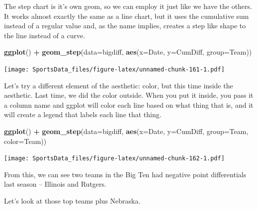 \documentclass[
]{book}
\newenvironment{Shaded}{\begin{snugshade}}{\end{snugshade}}
\newcommand{\DataTypeTok}[1]{\textcolor[rgb]{0.13,0.29,0.53}{#1}}
\newcommand{\KeywordTok}[1]{\textcolor[rgb]{0.13,0.29,0.53}{\textbf{#1}}}
\newcommand{\NormalTok}[1]{#1}
\newcommand{\OperatorTok}[1]{\textcolor[rgb]{0.81,0.36,0.00}{\textbf{#1}}}
\newcommand{\StringTok}[1]{\textcolor[rgb]{0.31,0.60,0.02}{#1}}
\begin{document}
The step chart is it's own geom, so we can employ it just like we have the others. It works almost exactly the same as a line chart, but it uses the cumulative sum instead of a regular value and, as the name implies, creates a step like shape to the line instead of a curve.

\begin{Shaded}
\begin{Highlighting}[]
\KeywordTok{ggplot}\NormalTok{() }\OperatorTok{+}\StringTok{ }\KeywordTok{geom_step}\NormalTok{(}\DataTypeTok{data=}\NormalTok{bigdiff, }\KeywordTok{aes}\NormalTok{(}\DataTypeTok{x=}\NormalTok{Date, }\DataTypeTok{y=}\NormalTok{CumDiff, }\DataTypeTok{group=}\NormalTok{Team))}
\end{Highlighting}
\end{Shaded}

\texttt{[image: SportsData\_files/figure-latex/unnamed-chunk-161-1.pdf]}

Let's try a different element of the aesthetic: color, but this time inside the aesthetic. Last time, we did the color outside. When you put it inside, you pass it a column name and ggplot will color each line based on what thing that is, and it will create a legend that labels each line that thing.

\begin{Shaded}
\begin{Highlighting}[]
\KeywordTok{ggplot}\NormalTok{() }\OperatorTok{+}\StringTok{ }\KeywordTok{geom_step}\NormalTok{(}\DataTypeTok{data=}\NormalTok{bigdiff, }\KeywordTok{aes}\NormalTok{(}\DataTypeTok{x=}\NormalTok{Date, }\DataTypeTok{y=}\NormalTok{CumDiff, }\DataTypeTok{group=}\NormalTok{Team, }\DataTypeTok{color=}\NormalTok{Team))}
\end{Highlighting}
\end{Shaded}

\texttt{[image: SportsData\_files/figure-latex/unnamed-chunk-162-1.pdf]}

From this, we can see two teams in the Big Ten had negative point differentials last season -- Illinois and Rutgers.

Let's look at those top teams plus Nebraska.

\begin{Shaded}
\end{Shaded}
\end{document}
